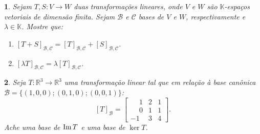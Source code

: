 \documentclass[12pt]{exam}
\newtheorem{exercicio}{}
\newcommand{\im}{{\rm Im\,}}
\newcommand{\real}{\mathbb{R}}
\newcommand{\cp}[1]{\mathbb{#1}}
\begin{document}
\begin{exercicio}
  Sejam $T, S : V \to W$ duas transforma\c{c}\~oes lineares, onde $V$ e $W$ s\~ao $\cp{K}$-espa\c{c}os vetoriais de dimens\~ao finita. Sejam $\mathcal{B}$ e $\mathcal{C}$ bases de $V$ e $W$, respectivamente e $\lambda \in \cp{K}$. Mostre que:
  \begin{enumerate}[label=({\alph*})]
    \item $[T + S]_{\mathcal{B}, \mathcal{C}} = [T]_{\mathcal{B}, \mathcal{C}} + [S]_{\mathcal{B}, \mathcal{C}}$.
    \item $[\lambda T]_{\mathcal{B}, \mathcal{C}} = \lambda [T]_{\mathcal{B}, \mathcal{C}}$.
  \end{enumerate}
\end{exercicio}

\begin{exercicio}
  Seja $T : \real^3 \to \real^3$ uma transforma\c{c}\~ao linear tal que em rela\c{c}\~ao \`a base can\^onica $\mathcal{B} = \{(1,0,0); (0,1,0); (0,0,1)\}$:
  \[
    [T]_\mathcal{B} =\begin{bmatrix}
      \phantom{-}1 & 2 & 1\\
      \phantom{-} 0 & 1 & 1\\
      -1 & 3 & 4
    \end{bmatrix}.
  \]
  Ache uma base de $\im T$ e uma base de $\ker T$.
\end{exercicio}
\end{document}
